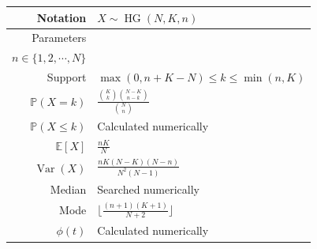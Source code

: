 \documentclass[a4paper,11pt]{article}
\theoremstyle{plain}
\theoremstyle{definition}
\newcommand{\ME}{\mathbb{E}}
\newcommand{\MP}{\mathbb{P}}
\newcommand{\MN}{\mathbb{N}}
\newcommand{\Var}{\operatorname{Var}}
\begin{document}
\begin{figure}[!htb]
\begin{minipage}{0.4\textwidth}
\begin{tabular}{| r | l |}
					\hline
					Notation & $ X \sim \operatorname{HG}(N, K, n) $ \\
					\hline
					Parameters & 
					\pbox{\linewidth}{$ N \in \MN, K \in \{1, 2, \dotsm, N  \},$ \\ $n \in \{1, 2, \dotsm, N  \}$} \\
					\hline
					Support & $ \max(0, n+K-N) \leq k \leq \min(n, K) $  \\
					\hline
					$\MP(X = k)$ & $ \frac{\binom{K}{k}\binom{N-K}{n-k}  }{\binom{N}{n}}   $ \\
					\hline
					$\MP(X \leq k)$ & Calculated numerically \\
					\hline
					$\ME[X]$ & $ \frac{nK}{N}$ \\
					\hline
					$\Var(X)$ & $ \frac{nK(N-K)(N-n)}{N^2(N-1)} $ \\
					\hline
					Median & Searched numerically \\
					\hline
					Mode & $ \Big\lfloor  \frac{(n+1)(K+1)}{N+2} \Big\rfloor  $ \\
					\hline
					$\phi(t)$ & Calculated numerically \\
					\hline
				\end{tabular}
			\end{minipage}
		\end{figure}
		
		
	\pagebreak
\end{document}
